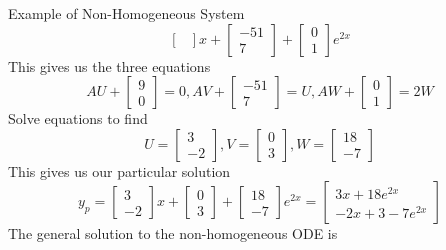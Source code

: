 \documentclass{article}
\begin{document}
\begin{multicols*}{3}
\begin{blackbox}{Example of Non-Homogeneous System}
{{\[\begin{bmatrix}
        \end{bmatrix}x + \begin{bmatrix}
            -51\\7
        \end{bmatrix} + \begin{bmatrix}
            0\\1
        \end{bmatrix}e^{2x}
        \]
    }
        This gives us the three equations 
        \[AU + \begin{bmatrix}
            9\\0
        \end{bmatrix} = 0, AV + \begin{bmatrix}
            -51\\7
        \end{bmatrix} = U, AW + \begin{bmatrix}
            0\\1
        \end{bmatrix} = 2W\]
        Solve equations to find\\[-2ex]
       \[U = \begin{bmatrix}
        3\\-2
       \end{bmatrix}, V = \begin{bmatrix}
        0\\3
       \end{bmatrix}, W = \begin{bmatrix}
        18\\-7
       \end{bmatrix}\]
        This gives us our particular solution
        \[
            y_p = \begin{bmatrix}
                3\\-2
            \end{bmatrix}x + \begin{bmatrix}
                0\\3
            \end{bmatrix} + \begin{bmatrix}
                18\\-7
            \end{bmatrix}e^{2x} = \begin{bmatrix}
                3x + 18e^{2x}\\
                -2x+3 - 7e^{2x}
            \end{bmatrix}  
        \]
        The general solution to the non-homogeneous ODE is 
}
\end{blackbox}
\end{multicols*}
\end{document}
